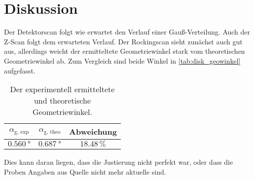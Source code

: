\section{Diskussion}
\label{sec:Diskussion}
Der Detektorscan folgt wie erwartet den Verlauf einer Gauß-Verteilung.
Auch der Z-Scan folgt dem erwarteten Verlauf.
Der Rockingscan sieht zunächst auch gut aus, allerdings weicht der ermitteltete Geometriewinkel stark vom theoretischen Geometriewinkel ab.
Zum Vergleich sind beide Winkel in \autoref{tab:disk_geowinkel} aufgefasst.
\begin{table}
    \centering
    \caption{Der experimentell ermitteltete und theoretische Geometriewinkel.}
    \begin{tabular}{ccc}
        \toprule
        $\alpha_\text{g, exp}$ & $\alpha_\text{g, theo} $ & Abweichung \\
        \midrule
        $\SI{0.560}{\degree}$ & $\SI{0.687}{\degree}$ & $18.48 \, \%$ \\
        \bottomrule
    \end{tabular}
    \label{tab:disk_geowinkel}
\end{table}
Dies kann daran liegen, dass die Justierung nicht perfekt war, oder dass die Proben Angaben aus Quelle \cite{alte_anleitung} nicht mehr aktuelle sind.

